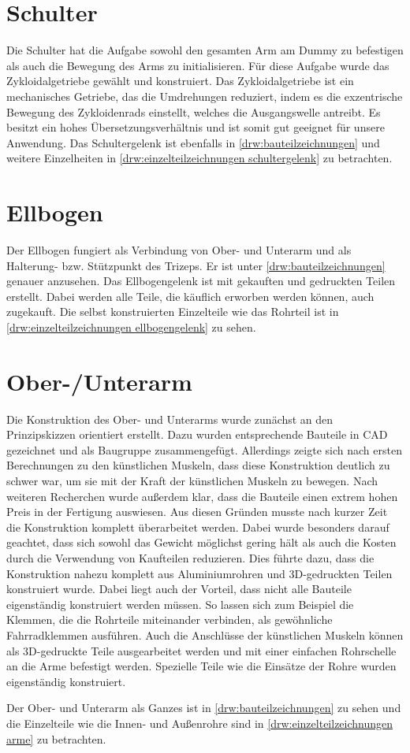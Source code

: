 	\section{Schulter}
		Die Schulter hat die Aufgabe sowohl den gesamten Arm am Dummy zu befestigen als auch die Bewegung des Arms zu initialisieren.
		Für diese Aufgabe wurde das Zykloidalgetriebe gewählt und konstruiert.
		Das Zykloidalgetriebe ist ein mechanisches Getriebe, das die Umdrehungen reduziert, indem es die exzentrische Bewegung des Zykloidenrads einstellt, welches die Ausgangswelle antreibt. Es besitzt ein hohes Übersetzungsverhältnis und ist somit gut geeignet für unsere Anwendung.
		Das Schultergelenk ist ebenfalls in \cref{drw:bauteilzeichnungen} und weitere Einzelheiten in \cref{drw:einzelteilzeichnungen schultergelenk} zu betrachten.
	
	\section{Ellbogen}
		Der Ellbogen fungiert als Verbindung von Ober- und Unterarm und als Halterung- bzw. Stützpunkt des Trizeps.
		Er ist unter \cref{drw:bauteilzeichnungen} genauer anzusehen.
		Das Ellbogengelenk ist mit gekauften und gedruckten Teilen erstellt.
		Dabei werden alle Teile, die käuflich erworben werden können, auch zugekauft.
		Die selbst konstruierten Einzelteile wie das Rohrteil ist in \cref{drw:einzelteilzeichnungen ellbogengelenk} zu sehen.
	
	\section{Ober-/Unterarm}
		Die Konstruktion des Ober- und Unterarms wurde zunächst an den Prinzipskizzen orientiert erstellt.
		Dazu wurden entsprechende Bauteile in CAD gezeichnet und als Baugruppe zusammengefügt.
		Allerdings zeigte sich nach ersten Berechnungen zu den künstlichen Muskeln, dass diese Konstruktion deutlich zu schwer war, um sie mit der Kraft der künstlichen Muskeln zu bewegen.
		Nach weiteren Recherchen wurde außerdem klar, dass die Bauteile einen extrem hohen Preis in der Fertigung auswiesen.
		Aus diesen Gründen musste nach kurzer Zeit die Konstruktion komplett überarbeitet werden.
		Dabei wurde besonders darauf geachtet, dass sich sowohl das Gewicht möglichst gering hält als auch die Kosten durch die Verwendung von Kaufteilen reduzieren.
		Dies führte dazu, dass die Konstruktion nahezu komplett aus Aluminiumrohren und 3D-gedruckten Teilen konstruiert wurde.
		Dabei liegt auch der Vorteil, dass nicht alle Bauteile eigenständig konstruiert werden müssen.
		So lassen sich zum Beispiel die Klemmen, die die Rohrteile miteinander verbinden, als gewöhnliche Fahrradklemmen ausführen.
		Auch die Anschlüsse der künstlichen Muskeln können als 3D-gedruckte Teile ausgearbeitet werden und mit einer einfachen Rohrschelle an die Arme befestigt werden.
		Spezielle Teile wie die Einsätze der Rohre wurden eigenständig konstruiert.\par
		Der Ober- und Unterarm als Ganzes ist in \cref{drw:bauteilzeichnungen} zu sehen und die Einzelteile wie die Innen- und Außenrohre sind in \cref{drw:einzelteilzeichnungen arme} zu betrachten.
	
